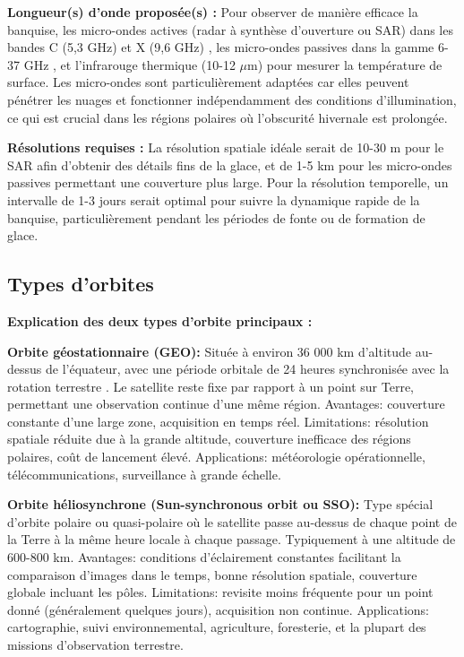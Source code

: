 \documentclass[12pt,a4paper]{article}
\begin{document}
\textbf{Longueur(s) d'onde proposée(s) :} Pour observer de manière efficace la banquise, les micro-ondes actives (radar à synthèse d'ouverture ou SAR) dans les bandes C (5,3 GHz) et X (9,6 GHz) \citep{Liu2023}, les micro-ondes passives dans la gamme 6-37 GHz \citep{Webster2023}, et l'infrarouge thermique (10-12 $\mu$m) pour mesurer la température de surface. Les micro-ondes sont particulièrement adaptées car elles peuvent pénétrer les nuages et fonctionner indépendamment des conditions d'illumination, ce qui est crucial dans les régions polaires où l'obscurité hivernale est prolongée.

\textbf{Résolutions requises :} La résolution spatiale idéale serait de 10-30 m pour le SAR afin d'obtenir des détails fins de la glace, et de 1-5 km pour les micro-ondes passives permettant une couverture plus large. Pour la résolution temporelle, un intervalle de 1-3 jours serait optimal pour suivre la dynamique rapide de la banquise, particulièrement pendant les périodes de fonte ou de formation de glace.

\subsection{Types d'orbites}

\textbf{Explication des deux types d'orbite principaux :}

\textbf{Orbite géostationnaire (GEO):} Située à environ 36 000 km d'altitude au-dessus de l'équateur, avec une période orbitale de 24 heures synchronisée avec la rotation terrestre \citep{Weather2023, Capderou2014}. Le satellite reste fixe par rapport à un point sur Terre, permettant une observation continue d'une même région. Avantages: couverture constante d'une large zone, acquisition en temps réel. Limitations: résolution spatiale réduite due à la grande altitude, couverture inefficace des régions polaires, coût de lancement élevé. Applications: météorologie opérationnelle, télécommunications, surveillance à grande échelle.

\textbf{Orbite héliosynchrone (Sun-synchronous orbit ou SSO):} Type spécial d'orbite polaire ou quasi-polaire où le satellite passe au-dessus de chaque point de la Terre à la même heure locale à chaque passage. Typiquement à une altitude de 600-800 km. Avantages: conditions d'éclairement constantes facilitant la comparaison d'images dans le temps, bonne résolution spatiale, couverture globale incluant les pôles. Limitations: revisite moins fréquente pour un point donné (généralement quelques jours), acquisition non continue. Applications: cartographie, suivi environnemental, agriculture, foresterie, et la plupart des missions d'observation terrestre.
\end{document}
